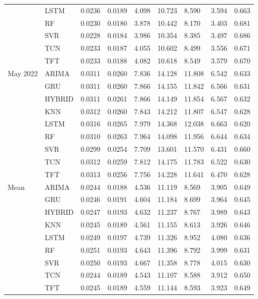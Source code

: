 \begin{tabular}{lllllllll}
 & LSTM & 0.0236 & 0.0189 & 4.098 & 10.723 & 8.590 & 3.594 & 0.663 \\
 & RF & 0.0230 & 0.0180 & 3.878 & 10.442 & 8.170 & 3.403 & 0.681 \\
 & SVR & 0.0228 & 0.0184 & 3.986 & 10.354 & 8.385 & 3.497 & 0.686 \\
 & TCN & 0.0233 & 0.0187 & 4.055 & 10.602 & 8.499 & 3.556 & 0.671 \\
 & TFT & 0.0233 & 0.0188 & 4.082 & 10.618 & 8.549 & 3.579 & 0.670 \\
May 2022 & ARIMA & 0.0311 & 0.0260 & 7.836 & 14.128 & 11.808 & 6.542 & 0.633 \\
 & GRU & 0.0311 & 0.0260 & 7.866 & 14.155 & 11.842 & 6.566 & 0.631 \\
 & HYBRID & 0.0311 & 0.0261 & 7.866 & 14.149 & 11.854 & 6.567 & 0.632 \\
 & KNN & 0.0312 & 0.0260 & 7.843 & 14.212 & 11.807 & 6.547 & 0.628 \\
 & LSTM & 0.0316 & 0.0265 & 7.979 & 14.368 & 12.038 & 6.663 & 0.620 \\
 & RF & 0.0310 & 0.0263 & 7.964 & 14.098 & 11.956 & 6.644 & 0.634 \\
 & SVR & 0.0299 & 0.0254 & 7.709 & 13.601 & 11.570 & 6.431 & 0.660 \\
 & TCN & 0.0312 & 0.0259 & 7.812 & 14.175 & 11.783 & 6.522 & 0.630 \\
 & TFT & 0.0313 & 0.0256 & 7.756 & 14.228 & 11.641 & 6.470 & 0.628 \\
Mean & ARIMA & 0.0244 & 0.0188 & 4.536 & 11.119 & 8.569 & 3.905 & 0.649 \\
 & GRU & 0.0246 & 0.0191 & 4.604 & 11.184 & 8.699 & 3.964 & 0.645 \\
 & HYBRID & 0.0247 & 0.0193 & 4.632 & 11.237 & 8.767 & 3.989 & 0.643 \\
 & KNN & 0.0245 & 0.0189 & 4.561 & 11.155 & 8.613 & 3.926 & 0.646 \\
 & LSTM & 0.0249 & 0.0197 & 4.739 & 11.326 & 8.952 & 4.080 & 0.636 \\
 & RF & 0.0251 & 0.0193 & 4.643 & 11.396 & 8.792 & 3.999 & 0.631 \\
 & SVR & 0.0250 & 0.0193 & 4.667 & 11.358 & 8.778 & 4.015 & 0.630 \\
 & TCN & 0.0244 & 0.0189 & 4.543 & 11.107 & 8.588 & 3.912 & 0.650 \\
 & TFT & 0.0245 & 0.0189 & 4.559 & 11.144 & 8.593 & 3.923 & 0.649 \\
\bottomrule
\end{tabular}
